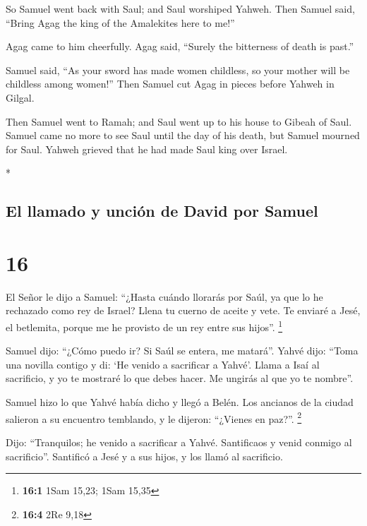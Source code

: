 \begin{paracol}{2}
\begin{otherlanguage}{english}
 So Samuel went back with Saul; and Saul worshiped
Yahweh.  Then Samuel said, ``Bring Agag the king of the
Amalekites here to me!''

Agag came to him cheerfully. Agag said, ``Surely the bitterness of death
is past.''

 Samuel said, ``As your sword has made women childless,
so your mother will be childless among women!'' Then Samuel cut Agag in
pieces before Yahweh in Gilgal.

 Then Samuel went to Ramah; and Saul went up to his house
to Gibeah of Saul.  Samuel came no more to see Saul until
the day of his death, but Samuel mourned for Saul. Yahweh grieved that
he had made Saul king over Israel.

\end{otherlanguage}

\switchcolumn[0]*

\hypertarget{el-llamado-y-unciuxf3n-de-david-por-samuel}{%
\subsection{El llamado y unción de David por
Samuel}\label{el-llamado-y-unciuxf3n-de-david-por-samuel}}

\hypertarget{section-30}{%
\section{16}\label{section-30}}

 El Señor le dijo a Samuel: ``¿Hasta cuándo llorarás por
Saúl, ya que lo he rechazado como rey de Israel? Llena tu cuerno de
aceite y vete. Te enviaré a Jesé, el betlemita, porque me he provisto de
un rey entre sus hijos''. \footnote{\textbf{16:1} 1Sam 15,23; 1Sam 15,35}

 Samuel dijo: ``¿Cómo puedo ir? Si Saúl se entera, me
matará''. Yahvé dijo: ``Toma una novilla contigo y di: `He venido a
sacrificar a Yahvé'.  Llama a Isaí al sacrificio, y yo te
mostraré lo que debes hacer. Me ungirás al que yo te nombre''.

 Samuel hizo lo que Yahvé había dicho y llegó a Belén. Los
ancianos de la ciudad salieron a su encuentro temblando, y le dijeron:
``¿Vienes en paz?''. \footnote{\textbf{16:4} 2Re 9,18}

 Dijo: ``Tranquilos; he venido a sacrificar a Yahvé.
Santificaos y venid conmigo al sacrificio''. Santificó a Jesé y a sus
hijos, y los llamó al sacrificio.


\end{paracol}
